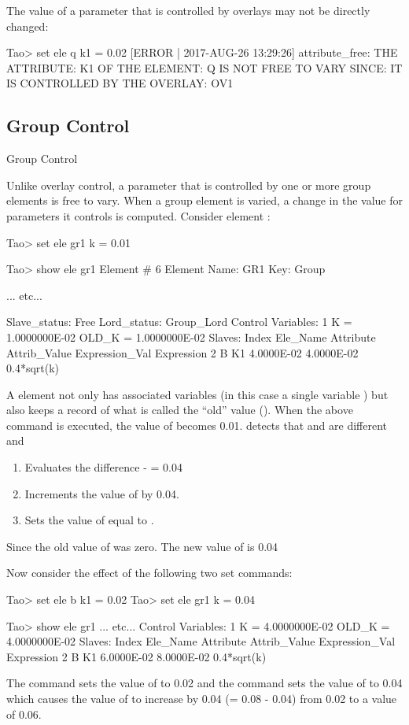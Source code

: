 \documentclass{hitec}
\begin{document}
The value of a parameter that is controlled by overlays may not be directly changed:
{\small
\begin{code}
Tao> set ele q k1 = 0.02
[ERROR | 2017-AUG-26 13:29:26] attribute_free:
    THE ATTRIBUTE: K1
    OF THE ELEMENT: Q
    IS NOT FREE TO VARY SINCE:
    IT IS CONTROLLED BY THE OVERLAY: OV1
\end{code}}

\subsection{Group Control}

Group Control

Unlike overlay control, a parameter that is controlled by one or more group elements is free to vary.
When a group element is varied, a change in the value for parameters it controls is computed.
Consider  element :
{\small
\begin{code} 
Tao> set ele gr1 k = 0.01

Tao> show ele gr1
 Element #                6
 Element Name: GR1
 Key: Group

... etc...    

Slave_status: Free
Lord_status:  Group_Lord
Control Variables:
    1   K  =  1.0000000E-02           OLD_K  =  1.0000000E-02
Slaves:
   Index   Ele_Name  Attribute   Attrib_Value  Expression_Val    Expression
       2   B         K1            4.0000E-02      4.0000E-02    0.4*sqrt(k)
\end{code}}
A  element not only has associated variables (in this case a single variable ) but
\bmad also keeps a record of what is called the ``old'' value (). When the above  command is executed, the value of  becomes 0.01. \bmad detects that 
and  are different and
\begin{enumerate}
\item
Evaluates the difference  -  = 0.04
\item
Increments the value of  by 0.04.
\item
Sets the value of  equal to .
\end{enumerate}
Since the old value of  was zero. The new value of  is 0.04

Now consider the effect of the following two set commands:
{\small
\begin{code}
Tao> set ele b k1 = 0.02
Tao> set ele gr1 k = 0.04

Tao> show ele gr1
... etc...
Control Variables:
    1   K  =  4.0000000E-02           OLD_K  =  4.0000000E-02
Slaves:
   Index   Ele_Name  Attribute   Attrib_Value  Expression_Val    Expression
       2   B         K1            6.0000E-02      8.0000E-02    0.4*sqrt(k)
\end{code}}
The  command sets the value of  to 0.02 and the  command
sets the value of  to 0.04 which causes the value of  to increase by 0.04 (=
0.08 - 0.04) from 0.02 to a value of 0.06.
\end{document}
